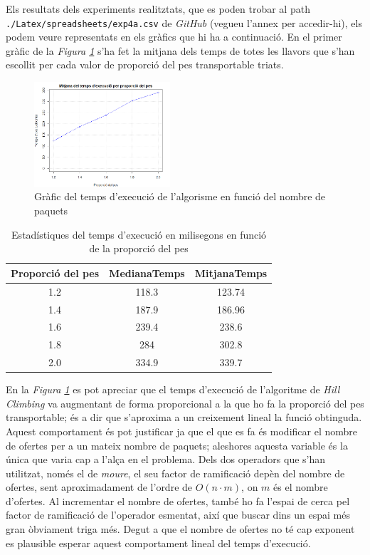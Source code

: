 \documentclass[a4paper]{article}
\begin{document}
	Els resultats dels experiments realitztats, que es poden trobar al path \texttt{./Latex/spreadsheets/exp4a.csv} de \textit{GitHub} (vegueu l'annex per accedir-hi), els podem veure representats en els gràfics que hi ha a continuació. En el primer gràfic de la \textit{Figura \ref{fig:exp4a_grafic_lineal}} s'ha fet la mitjana dels temps de totes les llavors que s'han escollit per cada valor de proporció del pes transportable triats.\\ 
	
	\begin{figure}[H]
		\centering
		\includegraphics[width=0.45\textwidth]{images/exp4a_grafic_lineal.png}
		\caption{Gràfic del temps d'execució de l'algorisme en funció del nombre de paquets}
		\label{fig:exp4a_grafic_lineal}
	\end{figure}
	
		\begin{table}[H]
		\centering
		\begin{tabular}{|c|c|c|}
			\hline
			\textbf{Proporció del pes} & \textbf{MedianaTemps} & \textbf{MitjanaTemps} \\
			\hline
			1.2 & 118.3 & 123.74\\
			\hline
			1.4 & 187.9 & 186.96\\
			\hline
			1.6 & 239.4 & 238.6\\
			\hline
			1.8 & 284 & 302.8\\
			\hline
			2.0 & 334.9 & 339.7\\
			\hline
		\end{tabular}
		\caption{Estadístiques del temps d'execució en milisegons en funció de la proporció del pes}
		\label{tab:exp4a_taula}
	\end{table}
	
	En la \textit{Figura \ref{fig:exp4a_grafic_lineal}} es pot apreciar que el temps d'execució de l'algoritme de \textit{Hill Climbing} va augmentant de forma proporcional a la que ho fa la proporció del pes transportable; és a dir que s'aproxima a un creixement lineal la funció obtinguda. \\
	Aquest comportament és pot justificar ja que el que es fa és modificar el nombre de ofertes per a un mateix nombre de paquets; aleshores aquesta variable és la única que varia cap a l'alça en el problema. Dels dos  operadors que s'han utilitzat, només el de \textit{moure}, el seu factor de ramificació depèn del nombre de ofertes, sent aproximadament de l'ordre de $O(n \cdot m)$, on $m$ és el nombre d'ofertes. Al incrementar el nombre de ofertes, també ho fa l'espai de cerca pel factor de ramificació de l'operador esmentat, així que buscar dins un espai més gran òbviament triga més. Degut a que el nombre de ofertes no té cap exponent es plausible esperar aquest comportament lineal del temps d'execució. 
\end{document}
